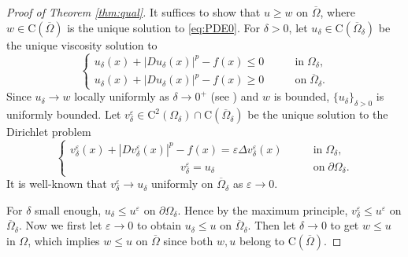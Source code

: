\documentclass[12pt,reqno]{amsart}
\numberwithin{figure}{section}
\theoremstyle{plain}
\theoremstyle{remark}
\numberwithin{equation}{section}
\newcommand{\rmC}{\mathrm{C}}
\begin{document}
\begin{proof}[Proof of Theorem \ref{thm:qual}]
It suffices to show that $u\geq w$ on $\overline{\Omega}$, where $w\in \rmC(\overline{\Omega})$ is the unique solution to \eqref{eq:PDE0}. For $\delta>0$, let $u_\delta\in\rmC(\overline{\Omega}_\delta)$ be the  unique viscosity solution to
\begin{equation}\label{e:v_v}
    \begin{cases}
      u_\delta(x) + |Du_\delta(x)|^p-f(x) \leq 0 &\qquad\text{in}\;\Omega_\delta,\\
      u_\delta(x) + |Du_\delta(x)|^p - f(x) \geq 0 &\qquad\text{on}\;\overline{\Omega}_\delta.
    \end{cases}
\end{equation}
Since $u_\delta\rightarrow w$ locally uniformly as $\delta\rightarrow 0^+$ (see \cite{kim_state-constraint_2020}) and $w$ is bounded, $\{u_\delta\}_{\delta>0}$ is uniformly bounded. Let $v^\varepsilon_\delta\in \rmC^2(\Omega_\delta)\cap \rmC(\overline{\Omega}_\delta)$ be the unique solution to the Dirichlet problem
\begin{equation}\label{eq:vv_eps}
\begin{cases}
      v_\delta^\varepsilon(x) + |Dv_\delta^\varepsilon(x)|^p - f(x) = \varepsilon \Delta v_\delta^\varepsilon(x) &\qquad\text{in}\;\Omega_\delta,\\
    \;\;\;\,\quad\qquad\qquad\qquad\qquad v_\delta^\varepsilon = u_\delta &\qquad \text{on}\;\partial\Omega_\delta.
\end{cases}
\end{equation}
It is well-known that $v^\varepsilon_\delta\to u_\delta$ uniformly on $\overline{\Omega}_\delta$ as $\varepsilon\to 0$.

For $\delta$ small enough, $u_\delta\leq u^\varepsilon$ on $\partial \Omega_\delta$. Hence by the maximum principle, $v^\varepsilon_\delta \leq u^\varepsilon$ on $\overline{\Omega}_\delta$. Now we first let $\varepsilon\to 0$ to obtain $u_\delta \leq u$ on $\overline{\Omega}_\delta$.
Then let $\delta\rightarrow 0$ to get $w\leq u$ in $\Omega$, which implies $w\leq u$ on $\overline{\Omega}$ since both $w,u$ belong to $\rmC(\overline{\Omega})$.
\end{proof}
\end{document}
